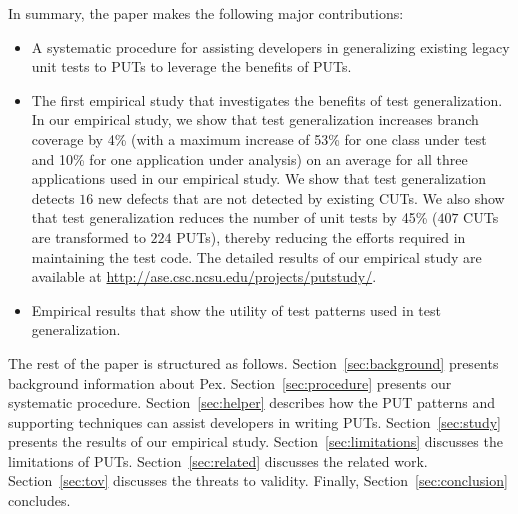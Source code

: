 In summary, the paper makes the following major contributions:
\begin{itemize}
	\item A systematic procedure for assisting developers in generalizing existing legacy unit tests to PUTs to leverage the benefits of PUTs.
	\item The first empirical study that investigates the benefits of test generalization. In our empirical study, we show that test generalization increases branch coverage by 4\% (with a maximum increase of 53\% for one class under test and 10\% for one application under analysis) on an average for all three applications used in our empirical study. We show that test generalization detects $16$ new defects that are not detected by existing CUTs. We also show that test generalization reduces the number of unit tests by 45\% ($407$ CUTs are transformed to $224$ PUTs), thereby reducing the efforts required in maintaining the test code. The detailed results of our empirical study are available at \url{http://ase.csc.ncsu.edu/projects/putstudy/}.	
	\item Empirical results that show the utility of test patterns used in test generalization.
\end{itemize}

The rest of the paper is structured as follows. 
Section~\ref{sec:background} presents background information about Pex. Section~\ref{sec:procedure} presents our systematic procedure.  
Section~\ref{sec:helper} describes how the PUT patterns and supporting techniques can assist developers in writing PUTs. 
Section~\ref{sec:study} presents the results of our empirical study. Section~\ref{sec:limitations} discusses the limitations of PUTs. Section~\ref{sec:related} discusses the related work. Section~\ref{sec:tov} discusses the threats to validity. Finally, Section~\ref{sec:conclusion} concludes.

